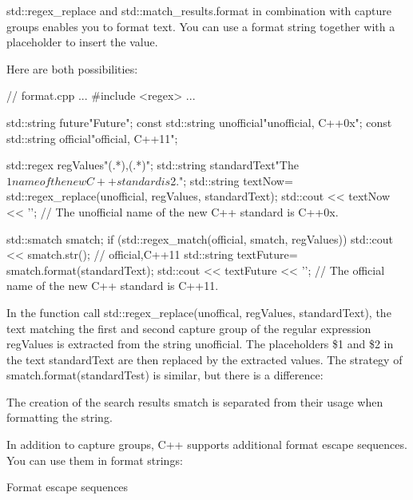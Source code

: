 
std::regex\_replace and std::match\_results.format in combination with capture groups enables you to format text. You can use a format string together with a placeholder to insert the value.

Here are both possibilities:


\begin{cpp}
// format.cpp
...
#include <regex>
...

std::string future{"Future"};
const std::string unofficial{"unofficial, C++0x"};
const std::string official{"official, C++11"};

std::regex regValues{"(.*),(.*)"};
std::string standardText{"The $1 name of the new C++ standard is $2."};
std::string textNow= std::regex_replace(unofficial, regValues, standardText);
std::cout << textNow << '\n';
			// The unofficial name of the new C++ standard is C++0x.

std::smatch smatch;
if (std::regex_match(official, smatch, regValues)){
	std::cout << smatch.str(); // official,C++11
	std::string textFuture= smatch.format(standardText);
	std::cout << textFuture << '\n';
} // The official name of the new C++ standard is C++11.
\end{cpp}

In the function call std::regex\_replace(unoffical, regValues, standardText), the text matching the first and second capture group of the regular expression regValues is extracted from the string unofficial. The placeholders \$1 and \$2 in the text standardText are then replaced by the extracted values. The strategy of smatch.format(standardTest) is similar, but there is a difference: 

The creation of the search results smatch is separated from their usage when formatting the string.

In addition to capture groups, C++ supports additional format escape sequences. You can use them in format strings:

\begin{center}
Format escape sequences
\end{center}

